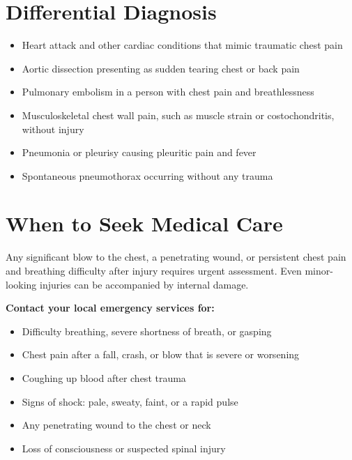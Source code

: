 \section*{Differential Diagnosis}
\begin{itemize}
    \item Heart attack and other cardiac conditions that mimic traumatic chest pain
    \item Aortic dissection presenting as sudden tearing chest or back pain
    \item Pulmonary embolism in a person with chest pain and breathlessness
    \item Musculoskeletal chest wall pain, such as muscle strain or costochondritis, without injury
    \item Pneumonia or pleurisy causing pleuritic pain and fever
    \item Spontaneous pneumothorax occurring without any trauma
\end{itemize}

\section*{When to Seek Medical Care}
Any significant blow to the chest, a penetrating wound, or persistent chest pain and breathing difficulty after injury requires urgent assessment. Even minor-looking injuries can be accompanied by internal damage.

\medskip
\textbf{Contact your local emergency services for:}
\begin{itemize}
    \item Difficulty breathing, severe shortness of breath, or gasping
    \item Chest pain after a fall, crash, or blow that is severe or worsening
    \item Coughing up blood after chest trauma
    \item Signs of shock: pale, sweaty, faint, or a rapid pulse
    \item Any penetrating wound to the chest or neck
    \item Loss of consciousness or suspected spinal injury
\end{itemize}


